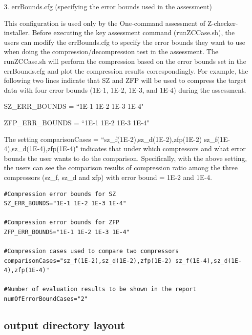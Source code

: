 3. errBounds.cfg (specifying the error bounds used in the assessment)

This configuration is used only by the One-command assessment of Z-checker-installer. Before executing the key assessment command (runZCCase.sh), the users can modify the errBounds.cfg to specify the error bounds they want to use when doing the compression/decompression test in the assessment. The runZCCase.sh will perform the compression based on the error bounds set in the errBounds.cfg and plot the compression results correspondingly.
For example, the following two lines indicate that SZ and ZFP will be used to compress the target data with four error bounds (1E-1, 1E-2, 1E-3, and 1E-4) during the assessment. 
 
SZ\_ERR\_BOUNDS = ``1E-1 1E-2 1E-3 1E-4"

ZFP\_ERR\_BOUNDS = ``1E-1 1E-2 1E-3 1E-4"

The setting comparisonCases = ``sz\_f(1E-2),sz\_d(1E-2),zfp(1E-2) sz\_f(1E-4),sz\_d(1E-4),zfp(1E-4)"  indicates that under which compressors and what error bounds the user wants to do the comparison. 
Specifically, with the above setting, the users can see the comparison results of compression ratio among the three compressors (sz\_f, sz\_d and zfp) with error bound = 1E-2 and 1E-4. 

\begin{lstlisting}[style=ShellStyleInline, basicstyle =\footnotesize\ttfamily]
#Compression error bounds for SZ
SZ_ERR_BOUNDS="1E-1 1E-2 1E-3 1E-4"

#Compression error bounds for ZFP
ZFP_ERR_BOUNDS="1E-1 1E-2 1E-3 1E-4"

#Compression cases used to compare two compressors
comparisonCases="sz_f(1E-2),sz_d(1E-2),zfp(1E-2) sz_f(1E-4),sz_d(1E-4),zfp(1E-4)"

#Number of evaluation results to be shown in the report
numOfErrorBoundCases="2"
\end{lstlisting}

\subsection{output directory layout}

